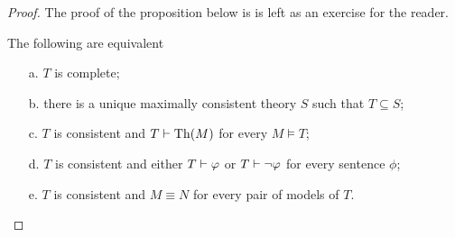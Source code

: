 \begin{proof}
The proof of the proposition below is is left as an exercise for the reader.

\begin{proposition}\label{fattoconsistenzasensolato}
The following are equivalent
\begin{itemize}
\item[a.] $T$ is complete;
\item[b.] there is a unique maximally consistent theory $S$ such that $T\subseteq S$;
\item[c.] $T$ is consistent and $T\vdash{\rm Th}(M)$ for every $M\models T$;
\item[d.] $T$ is consistent and either $T\vdash\varphi$ or $T\vdash\neg\varphi$ for every sentence $\phi$;
\item[e.] $T$ is consistent and $M\equiv N$ for every pair of models of $T$.
\end{itemize}
\end{proposition}

\end{proof}
